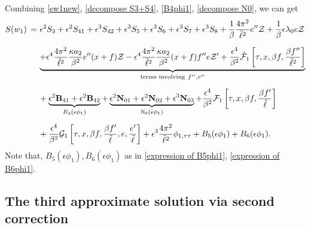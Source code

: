 \documentclass[10pt, reqno]{amsart}
\numberwithin{equation}{section}
\theoremstyle{definition}
\begin{document}
{{\medskip
 Combining \eqref{sw1new}, \eqref{decompose S3+S4}, \eqref{B4phi1}, \eqref{decompose N0}, we can get
\begin{align*}
 S(w_1)
 \,=\, &\,\epsilon^2 S_{3}
 + \epsilon^2 S_{41} + \epsilon^3 S_{42}+ \epsilon^3 S_{5}
 +\epsilon^3 S_{6} + \epsilon^3 S_{7} +\epsilon^3S_{8} + \frac1\beta\frac{4\pi^2}{{\tilde\ell}^2} e''\mathcal Z
 + \frac1\beta\epsilon\lambda_0 e{\mathcal Z}
\nonumber\\[2mm]
 &
 \underbrace{ +\epsilon^4 \frac{4\pi^2} {{\tilde\ell}^2} \frac{\kappa a_2}{\, \beta^2\, } e'' (x+f)\mathcal Z
 -\epsilon^4  \frac{ 4\pi^2} {{\tilde\ell}^2} \frac{\kappa a_2}{\, \beta^2\, } (x+f) f'' e \mathcal Z' + \frac{\epsilon^4}{\beta^2} \hat{\mathcal F}_1\left[\tau, x, \beta f, \frac{\beta f''}{\tilde\ell^2} \right] }_{\text{terms involving}~f'', e''}
\nonumber\\[2mm]
 &
+\underbrace{\epsilon^2 {\bf B}_{41} +\epsilon^2{\bf B}_{42}}_{B_4(\epsilon\phi_1)}
+\underbrace{\epsilon^2 {\bf N}_{01}+\epsilon^2 {\bf N}_{02} +\epsilon^3{\bf N}_{03}}_{\mathbb{N}_0(\epsilon\phi_1)}
 + \frac{\epsilon^4}{\beta^2} \mathcal F_1\left[\tau, x, \beta f, \frac{\beta f'}{\tilde\ell}\right]
\nonumber\\[2mm]
 &
 +\frac{\epsilon^4} {\beta^2} \mathcal G_1\left[\tau, x, \beta f, \frac{\beta f'}{\tilde\ell}, e, \frac{e'}{\tilde\ell}\right]
 + \epsilon^3\frac{ 4\pi^2}{{\tilde\ell}^2} {\phi}_{1, \tau\tau}
 +B_{5}(\epsilon\phi_1)+B_{6}(\epsilon\phi_1).
\end{align*}
 Note that,  $B_{5}(\epsilon\phi_1), B_{6}(\epsilon\phi_1)$ as in \eqref{expression of B5phi1}, \eqref{expression of B6phi1}.



\subsection{ The third approximate solution via second correction}\label{Section5.3}\

}}
\end{document}
